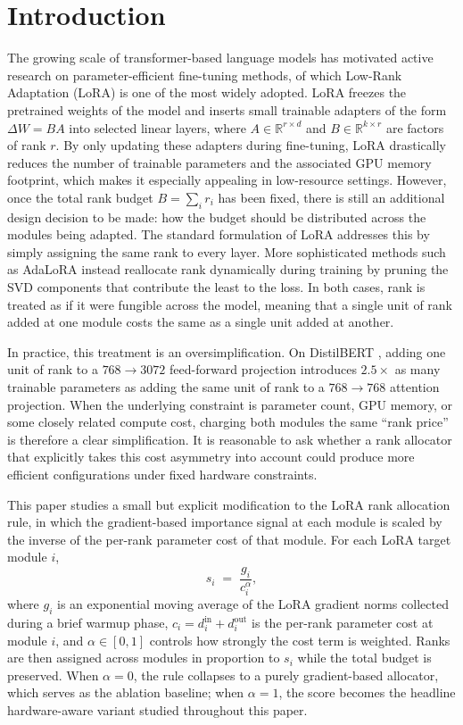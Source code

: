 \documentclass{article}
\begin{document}
\section{Introduction}
\label{sec:intro}

The growing scale of transformer-based language models has motivated
active research on parameter-efficient fine-tuning methods, of which
Low-Rank Adaptation (LoRA) \cite{hu2022lora} is one of the most widely
adopted. LoRA freezes the pretrained weights of the model and inserts
small trainable adapters of the form $\Delta W = BA$ into selected
linear layers, where $A \in \mathbb{R}^{r \times d}$ and
$B \in \mathbb{R}^{k \times r}$ are factors of rank $r$. By only
updating these adapters during fine-tuning, LoRA drastically reduces
the number of trainable parameters and the associated GPU memory
footprint, which makes it especially appealing in low-resource
settings. However, once the total rank budget $B = \sum_i r_i$ has
been fixed, there is still an additional design decision to be made:
how the budget should be distributed across the modules being adapted.
The standard formulation of LoRA addresses this by simply assigning
the same rank to every layer. More sophisticated methods such as
AdaLoRA \cite{zhang2023adalora} instead reallocate rank dynamically
during training by pruning the SVD components that contribute the
least to the loss. In both cases, rank is treated as if it were
fungible across the model, meaning that a single unit of rank added
at one module costs the same as a single unit added at another.

In practice, this treatment is an oversimplification. On
DistilBERT \cite{sanh2019distilbert}, adding one unit of rank to a
$768 \to 3072$ feed-forward projection introduces $2.5\times$ as many
trainable parameters as adding the same unit of rank to a
$768 \to 768$ attention projection. When the underlying constraint is
parameter count, GPU memory, or some closely related compute cost,
charging both modules the same ``rank price'' is therefore a clear
simplification. It is reasonable to ask whether a rank allocator that
explicitly takes this cost asymmetry into account could produce more
efficient configurations under fixed hardware constraints.

This paper studies a small but explicit modification to the LoRA rank
allocation rule, in which the gradient-based importance signal at
each module is scaled by the inverse of the per-rank parameter cost of
that module. For each LoRA target module $i$,
\begin{equation}
s_i \;=\; \frac{g_i}{c_i^{\alpha}},
\label{eq:rule}
\end{equation}
where $g_i$ is an exponential moving average of the LoRA gradient
norms collected during a brief warmup phase,
$c_i = d_i^{\text{in}} + d_i^{\text{out}}$ is the per-rank parameter
cost at module $i$, and $\alpha \in [0, 1]$ controls how strongly the
cost term is weighted. Ranks are then assigned across modules in
proportion to $s_i$ while the total budget is preserved. When
$\alpha = 0$, the rule collapses to a purely gradient-based allocator,
which serves as the ablation baseline; when $\alpha = 1$, the score
becomes the headline hardware-aware variant studied throughout this
paper.
\end{document}
